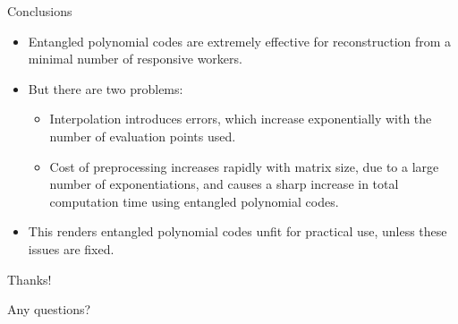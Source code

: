 \documentclass{beamer}
\begin{document}
\begin{frame}{Conclusions}
    \begin{itemize}
        \item Entangled polynomial codes are extremely effective for reconstruction from a minimal number of responsive workers.
        \item But there are two problems:
        \begin{itemize}
            \item Interpolation introduces errors, which increase exponentially with the number of evaluation points used.
            \item Cost of preprocessing increases rapidly with matrix size, due to a large number of exponentiations, and causes a sharp increase in total computation time using entangled polynomial codes.
        \end{itemize}
        \item This renders entangled polynomial codes unfit for practical use, unless these issues are fixed.
    \end{itemize}
\end{frame}

\begin{frame}{}
    \Large{Thanks!}

    \bigskip

    \normalsize{Any questions?}
\end{frame}
\end{document}
